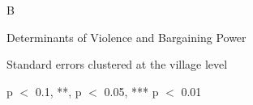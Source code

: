 B
\begin{threeparttable}
	\caption{Determinants of Violence and Bargaining Power}\label{tab:determinants_regression}
	\scriptsize 
	\centering
	
	
	\begin{tablenotes}
	\tiny
	 \item Standard errors clustered at the village level
	 \item * p $<$ 0.1, **, p $<$ 0.05, *** p $<$ 0.01
	\end{tablenotes}
\end{threeparttable}
